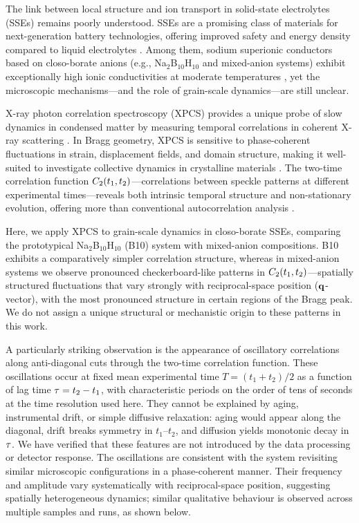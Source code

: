 
The link between local structure and ion transport in solid-state electrolytes (SSEs) remains poorly understood. SSEs are a promising class of materials for next-generation battery technologies, offering improved safety and energy density compared to liquid electrolytes \cite{ref1}. Among them, sodium superionic conductors based on closo-borate anions (e.g., Na$_2$B$_{10}$H$_{10}$ and mixed-anion systems) exhibit exceptionally high ionic conductivities at moderate temperatures \cite{ref2,ref3}, yet the microscopic mechanisms—and the role of grain-scale dynamics—are still unclear.

X-ray photon correlation spectroscopy (XPCS) provides a unique probe of slow dynamics in condensed matter by measuring temporal correlations in coherent X-ray scattering \cite{ref4,ref5}. In Bragg geometry, XPCS is sensitive to phase-coherent fluctuations in strain, displacement fields, and domain structure, making it well-suited to investigate collective dynamics in crystalline materials \cite{ref6}. The two-time correlation function $C_2(t_1, t_2)$—correlations between speckle patterns at different experimental times—reveals both intrinsic temporal structure and non-stationary evolution, offering more than conventional autocorrelation analysis \cite{ref7,ref8}.

Here, we apply XPCS to grain-scale dynamics in closo-borate SSEs, comparing the prototypical Na$_2$B$_{10}$H$_{10}$ (B10) system with mixed-anion compositions. B10 exhibits a comparatively simpler correlation structure, whereas in mixed-anion systems we observe pronounced checkerboard-like patterns in $C_2(t_1, t_2)$—spatially structured fluctuations that vary strongly with reciprocal-space position ($\mathbf{q}$-vector), with the most pronounced structure in certain regions of the Bragg peak. We do not assign a unique structural or mechanistic origin to these patterns in this work.

A particularly striking observation is the appearance of oscillatory correlations along anti-diagonal cuts through the two-time correlation function. These oscillations occur at fixed mean experimental time $T = (t_1 + t_2)/2$ as a function of lag time $\tau = t_2 - t_1$, with characteristic periods on the order of tens of seconds at the time resolution used here. They cannot be explained by aging, instrumental drift, or simple diffusive relaxation: aging would appear along the diagonal, drift breaks symmetry in $t_1$--$t_2$, and diffusion yields monotonic decay in $\tau$. We have verified that these features are not introduced by the data processing or detector response. The oscillations are consistent with the system revisiting similar microscopic configurations in a phase-coherent manner. Their frequency and amplitude vary systematically with reciprocal-space position, suggesting spatially heterogeneous dynamics; similar qualitative behaviour is observed across multiple samples and runs, as shown below.

